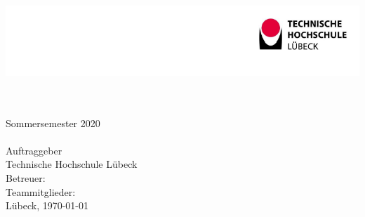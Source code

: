 \begin{titlepage}
	\centering
	
	\includegraphics[width=\textwidth]{titlepage/thl_logo.png}
	
	{\huge \textsc{\praktikumTitel}}\\[0.5cm]
	{\LARGE \textsc{\projektTitel}}\\[1.0cm]
	{\large Sommersemester 2020}\\[1.0cm]
	{\LARGE \bfseries\dokumentTitel}\\[1.0cm]
	Auftraggeber\\
	Technische Hochschule Lübeck\\
	Betreuer: \betreuer\\
	\vfill
	Teammitglieder:\\[0.5cm]
	\vfill
	Lübeck, \today
\end{titlepage}